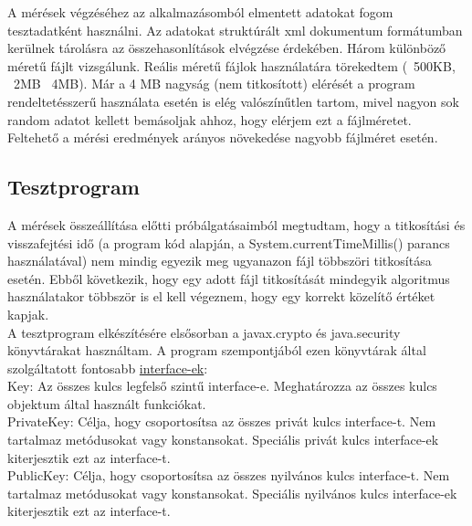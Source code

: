 \vspace{25pt}

A mérések végzéséhez az alkalmazásomból elmentett adatokat fogom tesztadatként használni. Az adatokat struktúrált xml dokumentum formátumban kerülnek tárolásra az összehasonlítások elvégzése érdekében. Három különböző méretű fájlt vizsgálunk. Reális méretű fájlok használatára törekedtem (~500KB, ~2MB ~4MB). Már a 4 MB nagyság (nem titkosított) elérését a program rendeltetésszerű használata esetén is elég valószínűtlen tartom, mivel nagyon sok random adatot kellett bemásoljak ahhoz, hogy elérjem ezt a fájlméretet. 
\vspace{5pt}\\Feltehető a mérési eredmények arányos növekedése nagyobb fájlméret esetén.

\subsection{Tesztprogram}
\vspace{5pt}\noindent A mérések összeállítása előtti próbálgatásaimból megtudtam, hogy a titkosítási és visszafejtési idő (a program kód alapján, a System.currentTimeMillis() parancs használatával) nem mindig egyezik meg ugyanazon fájl többszöri titkosítása esetén. Ebből következik, hogy egy adott fájl titkosítását mindegyik algoritmus használatakor többször is el kell végeznem, hogy egy korrekt közelítő értéket kapjak.
\vspace{5pt}\\A tesztprogram elkészítésére elsősorban a javax.crypto és java.security könyvtárakat használtam. A program szempontjából ezen könyvtárak által szolgáltatott fontosabb \underline{interface-ek}:
\vspace{5pt}\\Key: Az összes kulcs legfelső szintű interface-e. Meghatározza az összes kulcs objektum által használt funkciókat.
\vspace{5pt}\\PrivateKey: Célja, hogy csoportosítsa az összes privát kulcs interface-t. Nem tartalmaz metódusokat vagy konstansokat. Speciális privát kulcs interface-ek kiterjesztik ezt az interface-t. 
\vspace{5pt}\\PublicKey: Célja, hogy csoportosítsa az összes nyilvános kulcs interface-t. Nem tartalmaz metódusokat vagy konstansokat. Speciális nyilvános kulcs interface-ek kiterjesztik ezt az interface-t. \newline

